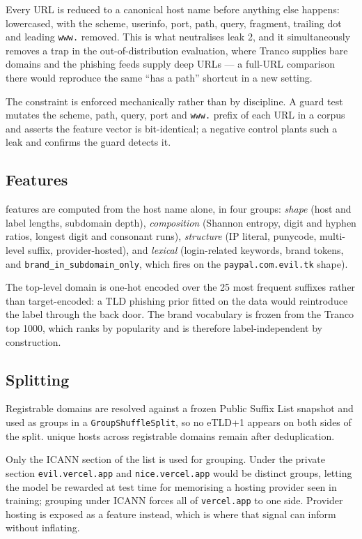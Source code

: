\documentclass[11pt,a4paper]{article}
\begin{document}
Every URL is reduced to a canonical host name before anything else happens: lowercased, with the
scheme, userinfo, port, path, query, fragment, trailing dot and leading \texttt{www.} removed. This
is what neutralises leak 2, and it simultaneously removes a trap in the out-of-distribution
evaluation, where Tranco supplies bare domains and the phishing feeds supply deep URLs --- a
full-URL comparison there would reproduce the same ``has a path'' shortcut in a new setting.

The constraint is enforced mechanically rather than by discipline. A guard test mutates the scheme,
path, query, port and \texttt{www.} prefix of each URL in a corpus and asserts the feature vector is
bit-identical; a negative control plants such a leak and confirms the guard detects it.

\subsection{Features}

\NumFeatures{} features are computed from the host name alone, in four groups: \emph{shape} (host
and label lengths, subdomain depth), \emph{composition} (Shannon entropy, digit and hyphen ratios,
longest digit and consonant runs), \emph{structure} (IP literal, punycode, multi-level suffix,
provider-hosted), and \emph{lexical} (login-related keywords, brand tokens, and
\texttt{brand\_in\_subdomain\_only}, which fires on the \texttt{paypal.com.evil.tk} shape).

The top-level domain is one-hot encoded over the 25 most frequent suffixes rather than
target-encoded: a TLD phishing prior fitted on the data would reintroduce the label through the back
door. The brand vocabulary is frozen from the Tranco top 1000, which ranks by popularity and is
therefore label-independent by construction.

\subsection{Splitting}

Registrable domains are resolved against a frozen Public Suffix List snapshot and used as groups in
a \texttt{GroupShuffleSplit}, so no eTLD+1 appears on both sides of the split. \TrainHosts{} unique
hosts across \TrainGroups{} registrable domains remain after deduplication.

Only the ICANN section of the list is used for grouping. Under the private section
\texttt{evil.vercel.app} and \texttt{nice.vercel.app} would be distinct groups, letting the model be
rewarded at test time for memorising a hosting provider seen in training; grouping under ICANN
forces all of \texttt{vercel.app} to one side. Provider hosting is exposed as a feature instead,
which is where that signal can inform without inflating.
\end{document}
